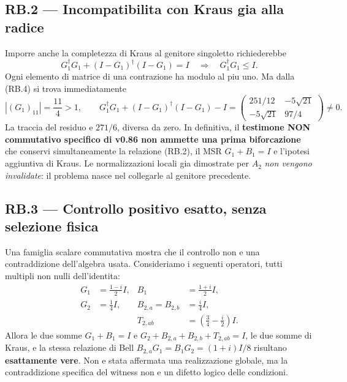 \documentclass[11pt,a4paper]{article}
\begin{document}
\subsection*{RB.2 --- Incompatibilita con Kraus gia alla radice}
Imporre anche la completezza di Kraus al genitore singoletto richiederebbe
\begin{equation}
 G_1^\dagger G_1+(I-G_1)^\dagger(I-G_1)=I
 \quad\Longrightarrow\quad G_1^\dagger G_1\le I.\tag{RB.5}
\end{equation}
Ogni elemento di matrice di una contrazione ha modulo al piu uno. Ma dalla (RB.4) si trova immediatamente
\begin{equation}
 \boxed{|(G_1)_{11}|=\frac{11}{4}>1},\qquad
 G_1^\dagger G_1+(I-G_1)^\dagger(I-G_1)-I
 =\begin{pmatrix}251/12&-5\sqrt{21}\\-5\sqrt{21}&97/4\end{pmatrix}\ne0.\tag{RB.6}
\end{equation}
La traccia del residuo e $271/6$, diversa da zero. In definitiva, il \textbf{testimone NON commutativo specifico di v0.86 non ammette una prima biforcazione} che conservi simultaneamente la relazione (RB.2), il MSR $G_1+B_1=I$ e l'ipotesi aggiuntiva di Kraus. Le normalizzazioni locali gia dimostrate per $A_2$ \emph{non vengono invalidate}: il problema nasce nel collegarle al genitore precedente.

\subsection*{RB.3 --- Controllo positivo esatto, senza selezione fisica}
Una famiglia scalare commutativa mostra che il controllo non e una contraddizione dell'algebra usata. Consideriamo i seguenti operatori, tutti multipli non nulli dell'identita:
\begin{equation}
 \begin{aligned}
 G_1&=\tfrac{1-i}2I,&B_1&=\tfrac{1+i}2I,\\
 G_2&=\tfrac14I,&B_{2,a}=B_{2,b}&=\tfrac{i}4I,\\
 &&T_{2,ab}&=(\tfrac34-\tfrac i2)I.
 \end{aligned}\tag{RB.7}
\end{equation}
Allora le due somme $G_1+B_1=I$ e $G_2+B_{2,a}+B_{2,b}+T_{2,ab}=I$, le due somme di Kraus, e la stessa relazione di Bell $B_{2,a}G_1=B_1G_2=(1+i)I/8$ risultano \textbf{esattamente vere}. Non e stata affermata una realizzazione globale, ma la contraddizione specifica del witness non e un difetto logico delle condizioni.
\end{document}
